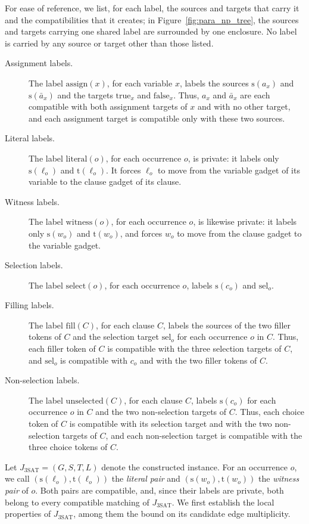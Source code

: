 \documentclass[a4paper,USenglish,thm-restate]{lipics-v2021}
\newcommand{\src}{\mathrm{s}}
\newcommand{\tgt}{\mathrm{t}}
\theoremstyle{problemstyle}
\begin{document}
\noindent
For ease of reference, we list, for each label, the sources and targets
that carry it and the compatibilities that it creates; in Figure~\ref{fig:para_np_tree}, the sources and targets carrying one shared label are surrounded by one enclosure. No label is carried by any
source or target other than those listed.

\begin{description}
\item[Assignment labels.] The label $\mathrm{assign}(x)$, for each variable
$x$, labels the sources $\src(a_x)$ and $\src(\bar{a}_x)$ and the targets
$\mathrm{true}_x$ and $\mathrm{false}_x$. Thus, $a_x$ and $\bar{a}_x$ are
each compatible with both assignment targets of $x$ and with no other
target, and each assignment target is compatible only with these two
sources.

\item[Literal labels.] The label $\mathrm{literal}(o)$, for each occurrence
$o$, is private: it labels only $\src(\ell_o)$ and $\tgt(\ell_o)$. It forces
$\ell_o$ to move from the variable gadget of its variable to the clause
gadget of its clause.

\item[Witness labels.] The label $\mathrm{witness}(o)$, for each occurrence
$o$, is likewise private: it labels only $\src(w_o)$ and $\tgt(w_o)$, and
forces $w_o$ to move from the clause gadget to the variable gadget.

\item[Selection labels.] The label $\mathrm{select}(o)$, for each occurrence
$o$, labels $\src(c_o)$ and $\mathrm{sel}_o$.

\item[Filling labels.] The label $\mathrm{fill}(C)$, for each clause $C$,
labels the sources of the two filler tokens of $C$ and the selection target
$\mathrm{sel}_o$ for each occurrence $o$ in $C$. Thus, each filler token of
$C$ is compatible with the three selection targets of $C$, and
$\mathrm{sel}_o$ is compatible with $c_o$ and with the two filler tokens of
$C$.

\item[Non-selection labels.] The label $\mathrm{unselected}(C)$, for each
clause $C$, labels $\src(c_o)$ for each occurrence $o$ in $C$ and the two
non-selection targets of $C$. Thus, each choice token of $C$ is compatible
with its selection target and with the two non-selection targets of $C$,
and each non-selection target is compatible with the three choice tokens of
$C$.
\end{description}
\smallskip
Let $J_{\mathrm{3SAT}}=(G,S,T,L)$ denote the constructed instance. For an occurrence $o$,
we call $(\src(\ell_o),\tgt(\ell_o))$ the \emph{literal pair} and
$(\src(w_o),\tgt(w_o))$ the \emph{witness pair} of $o$. Both pairs are
compatible, and, since their labels are private, both belong to every
compatible matching of $J_{\mathrm{3SAT}}$. We first establish the local properties of $J_{\mathrm{3SAT}}$, among them the bound on its candidate edge multiplicity.
\end{document}
